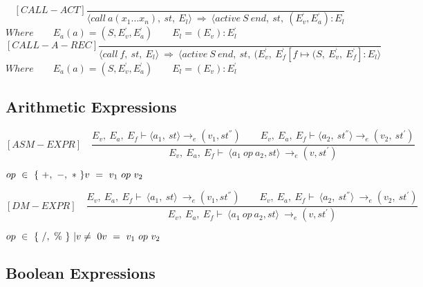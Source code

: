 	\[
	[CALL-ACT]
	\dfrac{}{ \langle call \ a(x_1 … x_n), \ st, \ E_l \rangle \ \Rightarrow \ \langle active \ S \ end, \ st, \ (E_v^{‘}, E_a^{‘}) : E_l}
	\]
	\begin{math}
	Where
	\qquad E_a(a) = (S, E_v^{‘}, E_a^{‘})
	\qquad E_l = (E_v) : E_l^{‘}
	\end{math}
	\[
	[CALL-A-REC]
	\dfrac{}{ \langle call \ f, \ st, \ E_l \rangle \ \Rightarrow \ \langle active \ S \ end, \ st, \ (E_v^{‘}, \ E_f^{‘}[f \mapsto (S, \ E_v^{‘}, \ E_f^{‘}] : E_l \rangle}
	\]
	\begin{math}
		Where
		\qquad E_a(a) = (S, E_v^{‘}, E_a^{‘})
		\qquad E_l = (E_v) : E_l^{‘}		
	\end{math}
	
	\subsection{Arithmetic Expressions}
	
	
	
	
	
	\[
	[ASM-EXPR] \quad	
	\dfrac{E_v, \ E_a, \ E_f \vdash \langle a_1, \ st \rangle \rightarrow_{e} (v_1, st^{''}) \qquad E_v, \ E_a, \ E_f \vdash \langle a_2, \ st^{''}\rangle \rightarrow_e (v_2, \ st^{'})}{E_v, \ E_a, \ E_f \vdash \ \langle a_1 \ op \ a_2, st \rangle \ \rightarrow_{e} (v, st^{'})}	
	\]
	
	
	\begin{math}		
		op \ \in \ \{ \ +, \ -, \ * \ \} \newline		
		v \ = \ v_1 \ op \ v_2		
	\end{math}
	
	
	
	
	
	\[
	[DM-EXPR] \quad
	\dfrac{E_v, \ E_a, \ E_f \vdash \ \langle a_1, \ st \rangle \ \rightarrow_{e} (v_1, st^{''}) \qquad E_v, \ E_a, \ E_f \vdash \ \langle a_2, \ st^{''} \rangle \ \rightarrow_e (v_2, \ st^{'})}{E_v, \ E_a, \ E_f \vdash \ \langle a_1 \ op \ a_2, st \rangle \ \rightarrow_{e} (v, st^{'})}	
	\]
	
	
	\begin{math}		
		op \ \in \ \{ \ /, \ \% \ \} \ | v \not= \ 0 \newline 		
		v \ = \ v_1 \ op \ v_2		
	\end{math} 
	
	
	
	
	
	\subsection{Boolean Expressions}
	
